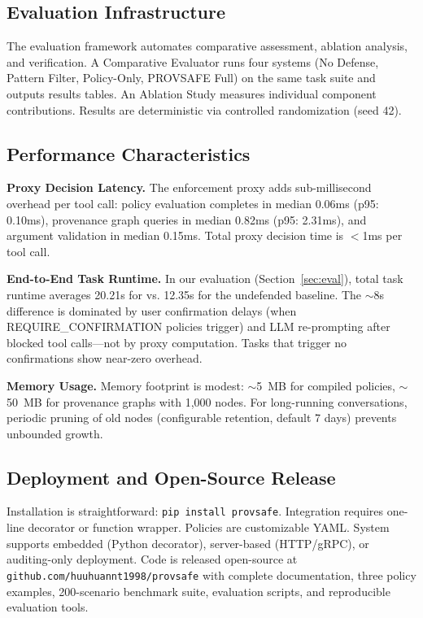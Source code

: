 \subsection{Evaluation Infrastructure}

The evaluation framework automates comparative assessment, ablation analysis, and verification. A Comparative Evaluator runs four systems (No Defense, Pattern Filter, Policy-Only, PROVSAFE Full) on the same task suite and outputs results tables. An Ablation Study measures individual component contributions. Results are deterministic via controlled randomization (seed 42).

\subsection{Performance Characteristics}

\textbf{Proxy Decision Latency.} The enforcement proxy adds sub-millisecond overhead per tool call: policy evaluation completes in median 0.06ms (p95: 0.10ms), provenance graph queries in median 0.82ms (p95: 2.31ms), and argument validation in median 0.15ms. Total proxy decision time is $<$1ms per tool call.

\textbf{End-to-End Task Runtime.} In our evaluation (Section~\ref{sec:eval}), total task runtime averages 20.21s for \sys{} vs. 12.35s for the undefended baseline. The $\sim$8s difference is dominated by user confirmation delays (when REQUIRE\_CONFIRMATION policies trigger) and LLM re-prompting after blocked tool calls---not by proxy computation. Tasks that trigger no confirmations show near-zero overhead.

\textbf{Memory Usage.} Memory footprint is modest: $\sim$5~MB for compiled policies, $\sim$50~MB for provenance graphs with 1,000 nodes. For long-running conversations, periodic pruning of old nodes (configurable retention, default 7 days) prevents unbounded growth.

\subsection{Deployment and Open-Source Release}

Installation is straightforward: \texttt{pip install provsafe}. Integration requires one-line decorator or function wrapper. Policies are customizable YAML. System supports embedded (Python decorator), server-based (HTTP/gRPC), or auditing-only deployment. Code is released open-source at \texttt{github.com/huuhuannt1998/provsafe} with complete documentation, three policy examples, 200-scenario benchmark suite, evaluation scripts, and reproducible evaluation tools.
